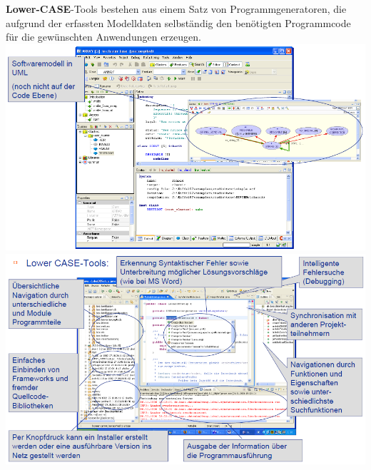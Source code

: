 \documentclass[10pt,a4paper,fleqn]{article}
\begin{document}
\begin{enumerate}
		\textbf{Lower-CASE}-Tools bestehen aus einem Satz von Programmgeneratoren, die aufgrund der erfassten Modelldaten selbständig den benötigten Programmcode für die gewünschten Anwendungen erzeugen.
		\includegraphics[scale=0.5]{UpperCASE.png}\\
		\includegraphics[scale=0.5]{LowerCASE.png}
\end{enumerate}
%
%
\end{document}
